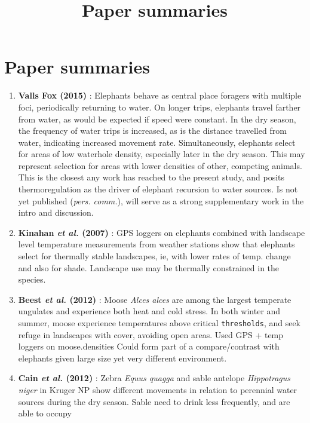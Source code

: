 \documentclass[10pt,twocolumn]{paper}
\title{Paper summaries}
\date{}
\providecommand{\tightlist}{%
  \setlength{\itemsep}{0pt}\setlength{\parskip}{0pt}}
\begin{document}
\maketitle

\section{Paper summaries}\label{paper-summaries}

\begin{enumerate}
\def\labelenumi{\arabic{enumi}.}
\tightlist
\item
  \textbf{Valls Fox (2015)} : Elephants behave as central place foragers
  with multiple foci, periodically returning to water. On longer trips,
  elephants travel farther from water, as would be expected if speed
  were constant. In the dry season, the frequency of water trips is
  increased, as is the distance travelled from water, indicating
  increased movement rate. Simultaneously, elephants select for areas of
  low waterhole density, especially later in the dry season. This may
  represent selection for areas with lower densities of other, competing
  animals. This is the closest any work has reached to the present
  study, and posits thermoregulation as the driver of elephant recursion
  to water sources. Is not yet published (\emph{pers. comm.}), will
  serve as a strong supplementary work in the intro and discussion.
\item
  \textbf{Kinahan \emph{et al.} (2007)} : GPS loggers on elephants
  combined with landscape level temperature measurements from weather
  stations show that elephants select for thermally stable landscapes,
  ie, with lower rates of temp. change and also for shade. Landscape use
  may be thermally constrained in the species.
\item
  \textbf{Beest \emph{et al.} (2012)} : Moose \emph{Alces alces} are
  among the largest temperate ungulates and experience both heat and
  cold stress. In both winter and summer, moose experience temperatures
  above critical \texttt{thresholds}, and seek refuge in landscapes with
  cover, avoiding open areas. Used GPS + temp loggers on moose.densities
  Could form part of a compare/contrast with elephants given large size
  yet very different environment.
\item
  \textbf{Cain \emph{et al.} (2012)} : Zebra \emph{Equus quagga} and
  sable antelope \emph{Hippotragus niger} in Kruger NP show different
  movements in relation to perennial water sources during the dry
  season. Sable need to drink less frequently, and are able to occupy

\end{enumerate}
\end{document}
